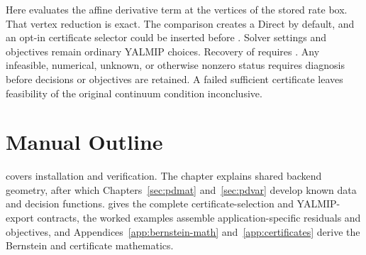 Here  evaluates the affine derivative term at the vertices of the stored rate box. That vertex reduction is exact. The comparison creates a Direct  by default, and an opt-in certificate selector could be inserted before . Solver settings and objectives remain ordinary YALMIP choices. Recovery of  requires . Any infeasible, numerical, unknown, or otherwise nonzero status requires diagnosis before decisions or objectives are retained. A failed sufficient certificate leaves feasibility of the original continuum condition inconclusive.

\section{Manual Outline}

\begin{center}
\end{center}

 covers installation and verification. The  chapter explains shared backend geometry, after which Chapters~\ref{sec:pdmat} and~\ref{sec:pdvar} develop known data and decision functions.  gives the complete certificate-selection and YALMIP-export contracts, the worked examples assemble application-specific residuals and objectives, and Appendices~\ref{app:bernstein-math} and~\ref{app:certificates} derive the Bernstein and certificate mathematics.
